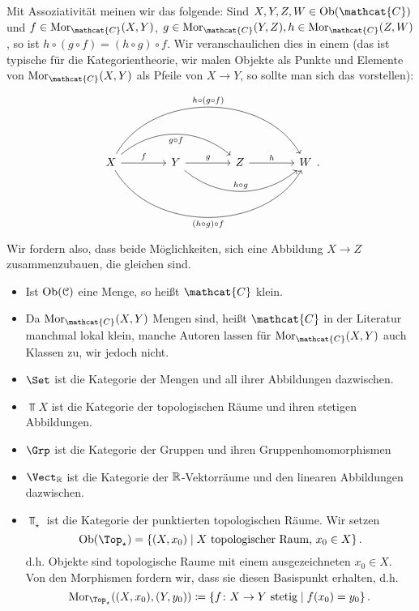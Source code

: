 \begin{remark*}
    Mit Assoziativität meinen wir das folgende: Sind $X,Y,Z,W\in \Ob(\mathcat{C})$ und $f\in \Mor_{\mathcat{C}}(X,Y)$, $g\in \Mor_{\mathcat{C}}(Y,Z), h\in \Mor_{\mathcat{C}}(Z,W)$, so ist $h \circ  (g \circ f) = (h \circ  g) \circ  f$. Wir veranschaulichen dies in einem  (das ist typische für die Kategorientheorie, wir malen Objekte als Punkte und Elemente von $\Mor_{\mathcat{C}}(X,Y)$ als Pfeile von $X\to Y$, so sollte man sich das vorstellen):
    \[
    \begin{tikzcd}[column sep = 4em, row sep = 4em]
        X \ar[bend left = 60]{rrr}{h \circ  (g \circ  f)} \ar[bend right = 60, swap]{rrr}{(h \circ  g) \circ f}\ar[bend left = 40,swap]{rr}{g \circ  f}\ar{r}{f} & Y\ar[bend right = 40]{rr}{h \circ  g} \ar{r}{g} & Z \ar{r}{h} & W
    \end{tikzcd}
    .\] 
    Wir fordern also, dass beide Möglichkeiten, sich eine Abbildung $X\to Z$ zusammenzubauen, die gleichen sind.
\end{remark*}

\begin{remark}
    \begin{itemize}
        \item Ist $\operatorname{Ob}(\mathcal{C})$ eine Menge, so heißt $\mathcat{C}$ klein.
        \item Da $\Mor_{\mathcat{C}}(X,Y)$ Mengen sind, heißt $\mathcat{C}$ in der Literatur manchmal lokal klein, manche Autoren lassen für $\Mor_{\mathcat{C}}(X,Y)$ auch Klassen zu, wir jedoch nicht.
    \end{itemize}
\end{remark}

\begin{example}
    \begin{itemize}
        \item $\Set$ ist die Kategorie der Mengen und all ihrer Abbildungen dazwischen.
        \item $\Top X$ ist die Kategorie der topologischen Räume und ihren stetigen Abbildungen.
        \item $\Grp$ ist die Kategorie der Gruppen und ihren Gruppenhomomorphismen
        \item  $\Vect_{\R}$ ist die Kategorie der $\mathbb{R}$-Vektorräume und den linearen Abbildungen dazwischen.
        \item $\Top_{\star}$ ist die Kategorie der punktierten topologischen Räume. Wir setzen
            \[
                \Ob(\Top_{\star}) = \left \{(X,x_0) \mid X \text{ topologischer Raum, } x_0\in X\right\} 
            .\] 
            d.h. Objekte sind topologische Raume mit einem ausgezeichneten  $x_0\in X$. Von den Morphismen fordern wir, dass sie diesen Basispunkt erhalten, d.h.
            \[
                \Mor_{\Top_{\star }}((X,x_0),(Y,y_0)) \coloneqq  \left \{f \colon X \to  Y \text{ stetig}\mid  f(x_0) = y_0\right\} 
            .\] 
    \end{itemize}
\end{example}


